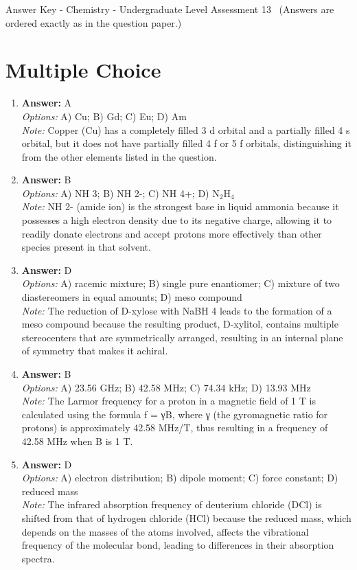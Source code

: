 \documentclass[12pt]{article}
\begin{document}
\begin{center}
Answer Key - Chemistry - Undergraduate Level Assessment 13 \
\small (Answers are ordered exactly as in the question paper.)
\end{center}

\section*{Multiple Choice}
\begin{enumerate}[label=\arabic*.]
\item \textbf{Answer:} A
\\ \textit{Options:} A) Cu; B) Gd; C) Eu; D) Am
\\ \textit{Note:} Copper (Cu) has a completely filled 3 d orbital and a partially filled 4 s orbital, but it does not have partially filled 4 f or 5 f orbitals, distinguishing it from the other elements listed in the question.
\item \textbf{Answer:} B
\\ \textit{Options:} A) NH 3; B) NH 2-; C) NH 4+; D) N$_{2}$H$_{4}$
\\ \textit{Note:} NH 2- (amide ion) is the strongest base in liquid ammonia because it possesses a high electron density due to its negative charge, allowing it to readily donate electrons and accept protons more effectively than other species present in that solvent.
\item \textbf{Answer:} D
\\ \textit{Options:} A) racemic mixture; B) single pure enantiomer; C) mixture of two diastereomers in equal amounts; D) meso compound
\\ \textit{Note:} The reduction of D-xylose with NaBH 4 leads to the formation of a meso compound because the resulting product, D-xylitol, contains multiple stereocenters that are symmetrically arranged, resulting in an internal plane of symmetry that makes it achiral.
\item \textbf{Answer:} B
\\ \textit{Options:} A) 23.56 GHz; B) 42.58 MHz; C) 74.34 kHz; D) 13.93 MHz
\\ \textit{Note:} The Larmor frequency for a proton in a magnetic field of 1 T is calculated using the formula f = γB, where γ (the gyromagnetic ratio for protons) is approximately 42.58 MHz/T, thus resulting in a frequency of 42.58 MHz when B is 1 T.
\item \textbf{Answer:} D
\\ \textit{Options:} A) electron distribution; B) dipole moment; C) force constant; D) reduced mass
\\ \textit{Note:} The infrared absorption frequency of deuterium chloride (DCl) is shifted from that of hydrogen chloride (HCl) because the reduced mass, which depends on the masses of the atoms involved, affects the vibrational frequency of the molecular bond, leading to differences in their absorption spectra.
\end{enumerate}
\end{document}
